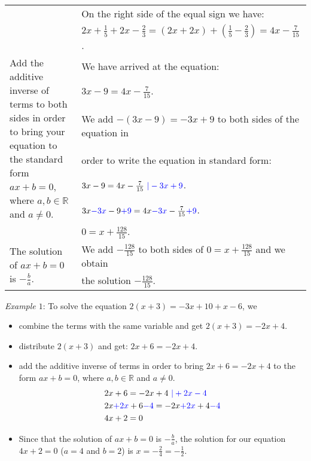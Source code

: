 \documentclass[12pt]{article}
\begin{document}
\begin{table*}[h!]
\begin{tabular}{ l | l }
		& On the right side of the equal sign we have:\\
		& $2x+\frac{1}{5}+2x-\frac{2}{3}=(2x+2x)+(\frac{1}{5}-\frac{2}{3})=4x-\frac{7}{15}$.
		\\\hline
\multirow{6}{15em}{Add the additive inverse of terms to both sides in order to bring your equation to the standard form $ax+b=0$, where $a,b\in \mathbb{R}$ and $a\neq 0$.}& We have arrived at the equation:\\
		& $3x-9=4x-\frac{7}{15}$.\\
		& We add $-(3x-9)=-3x+9$ to both sides of the equation in\\
		& order to write the equation in standard form:\\
		&  $3x-9=4x-\frac{7}{15}\textcolor{blue}{\ | -3x+9}$.\\
		& $3x\textcolor{blue}{-3x}-9\textcolor{blue}{+9}=4x\textcolor{blue}{-3x}-\frac{7}{15}\textcolor{blue}{+9}$.\\
		& $0=x+\frac{128}{15}$.
\\\hline
\multirow{2}{15em}{The solution of $ax+b=0$ is $-\frac{b}{a}$.}& We add $-\frac{128}{15}$ to both sides of $0=x+\frac{128}{15}$ and we obtain\\
		& the solution $-\frac{128}{15}$.
\\\hline
\end{tabular}
\end{table*}

\newpage
\textit{Example $1$}: To solve the equation $ 2(x + 3) = -3x + 10+x-6$, we 
\begin{itemize}
\item combine the terms with the same variable and get $2(x+3)=-2x+4$.
\item distribute $2(x+3)$ and get: $2x+6=-2x+4$.
\item add the additive inverse of terms in order to bring $2x+6=-2x+4$ to the form $ax+b=0$, where $a,b\in \mathbb{R}$ and $a\neq 0$. 
\begin{equation*}
\begin{split}
& 2x+6=-2x+4 \textcolor{blue}{\ | +2x-4}\\
& 2x\textcolor{blue}{+2x}+6\textcolor{blue}{-4}=-2x\textcolor{blue}{+2x}+4\textcolor{blue}{-4}\\
& 4x+2=0\\
\end{split}
\end{equation*}
\item Since that the solution of $ax+b=0$ is $-\frac{b}{a}$, the solution for our equation $4x+2=0$ ($a=4$ and $b=2$) is $x=-\frac{2}{4}=-\frac{1}{2}$.
\end{itemize}
\end{document}
